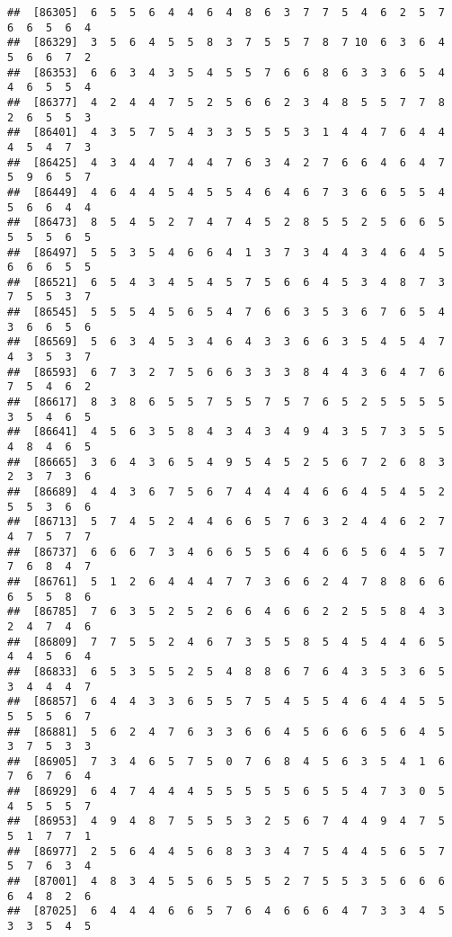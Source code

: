 \documentclass[
]{book}
\begin{document}
\begin{verbatim}
##  [86305]  6  5  5  6  4  4  6  4  8  6  3  7  7  5  4  6  2  5  7  6  6  5  6  4
##  [86329]  3  5  6  4  5  5  8  3  7  5  5  7  8  7 10  6  3  6  4  5  6  6  7  2
##  [86353]  6  6  3  4  3  5  4  5  5  7  6  6  8  6  3  3  6  5  4  4  6  5  5  4
##  [86377]  4  2  4  4  7  5  2  5  6  6  2  3  4  8  5  5  7  7  8  2  6  5  5  3
##  [86401]  4  3  5  7  5  4  3  3  5  5  5  3  1  4  4  7  6  4  4  4  5  4  7  3
##  [86425]  4  3  4  4  7  4  4  7  6  3  4  2  7  6  6  4  6  4  7  5  9  6  5  7
##  [86449]  4  6  4  4  5  4  5  5  4  6  4  6  7  3  6  6  5  5  4  5  6  6  4  4
##  [86473]  8  5  4  5  2  7  4  7  4  5  2  8  5  5  2  5  6  6  5  5  5  5  6  5
##  [86497]  5  5  3  5  4  6  6  4  1  3  7  3  4  4  3  4  6  4  5  6  6  6  5  5
##  [86521]  6  5  4  3  4  5  4  5  7  5  6  6  4  5  3  4  8  7  3  7  5  5  3  7
##  [86545]  5  5  5  4  5  6  5  4  7  6  6  3  5  3  6  7  6  5  4  3  6  6  5  6
##  [86569]  5  6  3  4  5  3  4  6  4  3  3  6  6  3  5  4  5  4  7  4  3  5  3  7
##  [86593]  6  7  3  2  7  5  6  6  3  3  3  8  4  4  3  6  4  7  6  7  5  4  6  2
##  [86617]  8  3  8  6  5  5  7  5  5  7  5  7  6  5  2  5  5  5  5  3  5  4  6  5
##  [86641]  4  5  6  3  5  8  4  3  4  3  4  9  4  3  5  7  3  5  5  4  8  4  6  5
##  [86665]  3  6  4  3  6  5  4  9  5  4  5  2  5  6  7  2  6  8  3  2  3  7  3  6
##  [86689]  4  4  3  6  7  5  6  7  4  4  4  4  6  6  4  5  4  5  2  5  5  3  6  6
##  [86713]  5  7  4  5  2  4  4  6  6  5  7  6  3  2  4  4  6  2  7  4  7  5  7  7
##  [86737]  6  6  6  7  3  4  6  6  5  5  6  4  6  6  5  6  4  5  7  7  6  8  4  7
##  [86761]  5  1  2  6  4  4  4  7  7  3  6  6  2  4  7  8  8  6  6  6  5  5  8  6
##  [86785]  7  6  3  5  2  5  2  6  6  4  6  6  2  2  5  5  8  4  3  2  4  7  4  6
##  [86809]  7  7  5  5  2  4  6  7  3  5  5  8  5  4  5  4  4  6  5  4  4  5  6  4
##  [86833]  6  5  3  5  5  2  5  4  8  8  6  7  6  4  3  5  3  6  5  3  4  4  4  7
##  [86857]  6  4  4  3  3  6  5  5  7  5  4  5  5  4  6  4  4  5  5  5  5  5  6  7
##  [86881]  5  6  2  4  7  6  3  3  6  6  4  5  6  6  6  5  6  4  5  3  7  5  3  3
##  [86905]  7  3  4  6  5  7  5  0  7  6  8  4  5  6  3  5  4  1  6  7  6  7  6  4
##  [86929]  6  4  7  4  4  4  5  5  5  5  5  6  5  5  4  7  3  0  5  4  5  5  5  7
##  [86953]  4  9  4  8  7  5  5  5  3  2  5  6  7  4  4  9  4  7  5  5  1  7  7  1
##  [86977]  2  5  6  4  4  5  6  8  3  3  4  7  5  4  4  5  6  5  7  5  7  6  3  4
##  [87001]  4  8  3  4  5  5  6  5  5  5  2  7  5  5  3  5  6  6  6  6  4  8  2  6
##  [87025]  6  4  4  4  6  6  5  7  6  4  6  6  6  4  7  3  3  4  5  3  3  5  4  5

\end{verbatim}
\end{document}

